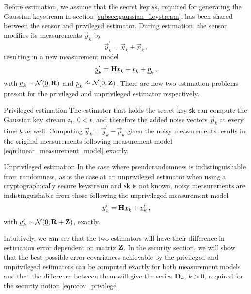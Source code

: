\documentclass[letterpaper, 10 pt, conference]{IEEEtran}
\theoremstyle{definition}
\begin{document}
Before estimation, we assume that the secret key $\mathsf{sk}$, required for generating the Gaussian keystream in section \ref{subsec:gaussian_keystream}, has been shared between the sensor and privileged estimator. During estimation, the sensor modifies its measurements $\vec{y}_k$ by
\begin{equation}\label{eqn:modified_measurement}
   \vec{y}^\prime_k = \vec{y}_k + \vec{p}_k\,,
\end{equation}
resulting in a new measurement model
\begin{equation}
   {\underline{y}}^\prime_k = {{\mathbf{H}}}{\underline{x}}_k + {\underline{v}}_k + {\underline{p}}_k\,,
\end{equation}
with ${\underline{v}}_k\sim \mathcal{N}({\underline{0}},{{\mathbf{R}}})$ and $\vec{p}_k\ \dot{\sim}\ \mathcal{N}(\vec{0},\mat{Z})$. There are now two estimation problems present for the privileged and unprivileged estimator respectively.
\begin{LaTeXdescription}
   \item[Privileged estimation] The estimator that holds the secret key $\mathsf{sk}$ can compute the Gaussian key stream $z_t$, $0<t$, and therefore the added noise vectors $\vec{p}_k$ at every time $k$ as well. Computing $\vec{y}_k = \vec{y}^\prime_k - \vec{p}_k$ given the noisy measurements results in the original measurements following measurement model \eqref{eqn:linear_measurement_model} exactly.
   \item[Unprivileged estimation] In the case where pseudorandomness is indistinguishable from randomness, as is the case at an unprivileged estimator when using a cryptographically secure keystream and $\mathsf{sk}$ is not known, noisy measurements are indistinguishable from those following the unprivileged measurement model 
   \begin{equation}\label{eqn:unprivileged_measurement_model}
      \vec{y}^\prime_k = \mat{H}\vec{x}_k + \vec{v}^\prime_k\,,
   \end{equation}
   with ${\underline{v}}^\prime_k\sim \mathcal{N}({\underline{0}},{{\mathbf{R}}}+{{\mathbf{Z}}})$, exactly.
\end{LaTeXdescription}

Intuitively, we can see that the two estimators will have their difference in estimation error dependent on matrix ${{\mathbf{Z}}}$. In the security section, we will show that the best possible error covariances achievable by the privileged and unprivileged estimators can be computed exactly for both measurement models and that the difference between them will give the series ${{\mathbf{D}}}_k$, $k>0$, required for the security notion \eqref{eqn:cov_privilege}.
\end{document}
